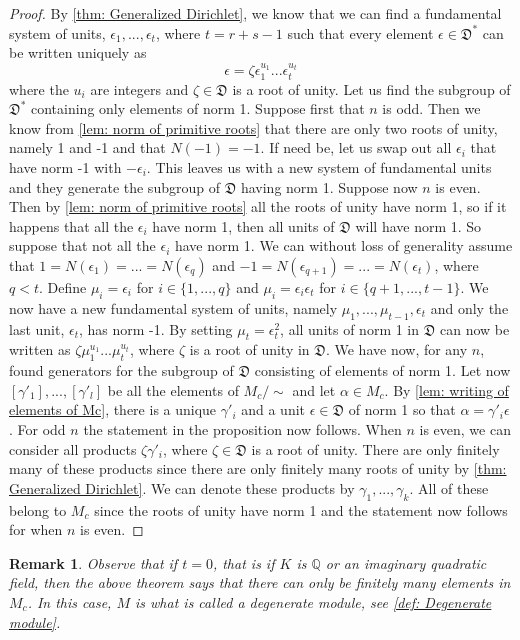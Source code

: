 \documentclass{article}
\newtheorem{remark}{Remark}[section]
\newcommand{\mfrak}[1]{\mathfrak{#1}}
\newcommand{\mbb}[1]{\mathbb{#1}}
\numberwithin{equation}{section}
\begin{document}
\begin{proof}
    By \cref{thm: Generalized Dirichlet}, we know that we can find a fundamental system of units, $\epsilon_1, ..., \epsilon_t$, where $t = r+s-1$ such that every element $\epsilon \in \mfrak D^*$ can be written uniquely as
    $$\epsilon = \zeta \epsilon_1^{u_1} ... \epsilon_t^{u_t}$$
    where the $u_i$ are integers and $\zeta \in \mfrak D$ is a root of unity. Let us find the subgroup of $\mfrak D^*$ containing only elements of norm 1. Suppose first that $n$ is odd. Then we know from \cref{lem: norm of primitive roots} that there are only two roots of unity, namely 1 and -1 and that $N(-1) = -1$. If need be, let us swap out all $\epsilon_i$ that have norm -1 with $-\epsilon_i$. This leaves us with a new system of fundamental units and they generate the subgroup of $\mfrak D$ having norm 1. Suppose now $n$ is even. Then by \cref{lem: norm of primitive roots} all the roots of unity have norm 1, so if it happens that all the $\epsilon_i$ have norm 1, then all units of $\mfrak D$ will have norm 1. So suppose that not all the $\epsilon_i$ have norm 1. We can without loss of generality assume that $1 = N(\epsilon_1) = ... = N(\epsilon_q)$ and $-1 = N(\epsilon_{q+1}) = ... = N(\epsilon_t)$, where $q < t$. Define
    $\mu_i = \epsilon_i$ for $i \in \{1, ..., q\}$ and $\mu_i = \epsilon_i \epsilon_t$ for $i \in \{q+1, ..., t-1\}$. We now have a new fundamental system of units, namely $\mu_1, ..., \mu_{t-1},\epsilon_t$ and only the last unit, $\epsilon_t$, has norm -1. By setting $\mu_t = \epsilon_t^2$, all units of norm 1 in $\mfrak D$ can now be written as $\zeta \mu_1^{u_1}...\mu_t^{u_t}$, where $\zeta$ is a root of unity in $\mfrak D$. We have now, for any $n$, found generators for the subgroup of $\mfrak D$ consisting of elements of norm 1. Let now $[\gamma'_1], ..., [\gamma'_l]$ be all the elements of $M_c / \sim$ and let $\alpha \in M_c$. By \cref{lem: writing of elements of Mc}, there is a unique $\gamma'_i$ and a unit $\epsilon \in \mfrak D$ of norm 1 so that $\alpha = \gamma'_i \epsilon$. For odd $n$ the statement in the proposition now follows. When $n$ is even, we can consider all products $\zeta \gamma'_i$, where $\zeta \in \mfrak D$ is a root of unity. There are only finitely many of these products since there are only finitely many roots of unity by \cref{thm: Generalized Dirichlet}. We can denote these products by $\gamma_1, ..., \gamma_k$. All of these belong to $M_c$ since the roots of unity have norm 1 and the statement now follows for when $n$ is even.
\end{proof}
\begin{remark}\label{rem: When does a full module have finitely many solutions}
    Observe that if $t = 0$, that is if $K$ is $\mbb Q$ or an imaginary quadratic field, then the above theorem says that there can only be finitely many elements in $M_c$. In this case, $M$ is what is called a degenerate module, see \cref{def: Degenerate module}.
\end{remark}
\end{document}
